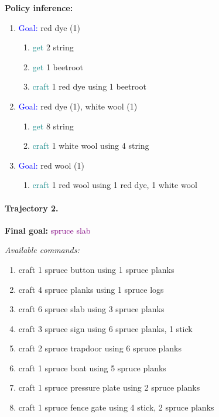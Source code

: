 \textbf{Policy inference:}
\begin{enumerate}[label=\textbf{Manager:}, leftmargin=2.4em, labelsep=.5em, align=left]
    \item \textcolor{blue}{Goal:} red dye (1)
    \begin{enumerate}[label=\textbf{Employee:}, leftmargin=2.8em, labelsep=.5em, align=left]
        \item \textcolor{teal}{get} 2 string
        \item \textcolor{teal}{get} 1 beetroot
        \item \textcolor{teal}{craft} 1 red dye using 1 beetroot
    \end{enumerate}

    \item \textcolor{blue}{Goal:} red dye (1), white wool (1)
    \begin{enumerate}[label=\textbf{Employee :}, leftmargin=2.8em, labelsep=.5em, align=left]
        \item \textcolor{teal}{get} 8 string
        \item \textcolor{teal}{craft} 1 white wool using 4 string
    \end{enumerate}

    \item \textcolor{blue}{Goal:} red wool (1)
    \begin{enumerate}[label=\textbf{Employee :}, leftmargin=2.8em, labelsep=.5em, align=left]
        \item \textcolor{teal}{craft} 1 red wool using 1 red dye, 1 white wool
    \end{enumerate}
\end{enumerate}

\paragraph{Trajectory 2.}
\textbf{Final goal:} \textcolor{purple}{spruce slab}

\textit{Available commands:}
\begin{enumerate}[leftmargin=2em]
    \item craft 1 spruce button using 1 spruce planks
    \item craft 4 spruce planks using 1 spruce logs
    \item craft 6 spruce slab using 3 spruce planks
    \item craft 3 spruce sign using 6 spruce planks, 1 stick
    \item craft 2 spruce trapdoor using 6 spruce planks
    \item craft 1 spruce boat using 5 spruce planks
    \item craft 1 spruce pressure plate using 2 spruce planks
    \item craft 1 spruce fence gate using 4 stick, 2 spruce planks
\end{enumerate}

